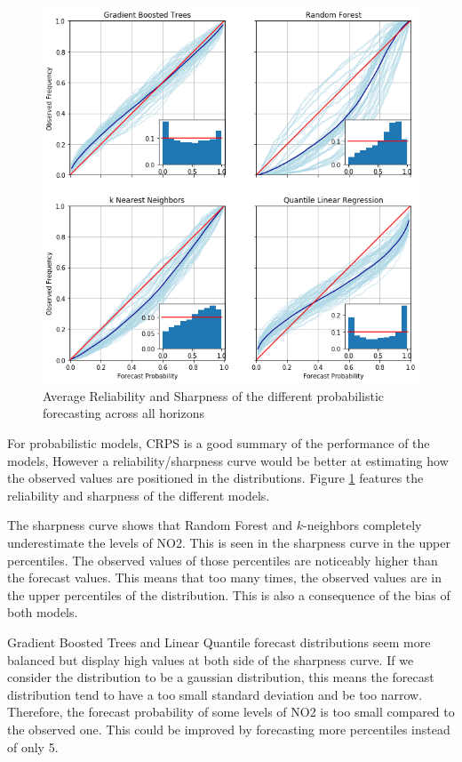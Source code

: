 \documentclass[a4paper,twocolumn,5p]{elsarticle}
\begin{document}
\begin{figure}
  \centering
  \includegraphics[width=1\textwidth]{reliability_sharpness}
  \caption{Average Reliability and Sharpness of the different probabilistic forecasting
  across all horizons}
  \label{figure:rel_sharp} 
\end{figure}

For probabilistic models, CRPS is a good summary of 
the performance of the models,
However a reliability/sharpness curve would be better at estimating 
how the observed values are positioned in the distributions.
Figure \ref{figure:rel_sharp} features the 
reliability and sharpness of the different models.

The sharpness curve shows that Random Forest and 
$k$-neighbors completely
underestimate the levels of NO2. This is seen 
in the sharpness curve
in the upper percentiles. The observed values 
of those percentiles are noticeably higher than 
the forecast values. This means that too many times, 
the observed values are in the upper percentiles of 
the distribution.
This is also a consequence of the bias of both models.

Gradient Boosted Trees and Linear Quantile forecast 
distributions seem 
more balanced but display 
high values at both side of the sharpness curve. 
If we consider the distribution
to be a gaussian distribution, this
means the forecast distribution tend to have a 
too small standard deviation 
and be 
too narrow. Therefore, the forecast probability of some 
levels of NO2 is too small compared to the observed one.
This could be improved by forecasting more percentiles 
instead of only 5.
\end{document}
